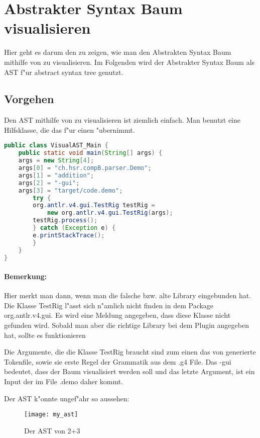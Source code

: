 
\section{Abstrakter Syntax Baum visualisieren}
\label{sec:visualizeAST}
Hier geht es darum den zu zeigen, wie man den Abstrakten Syntax Baum mithilfe von \antlr zu visualisieren. Im Folgenden wird der Abstrakter Syntax Baum als AST f"ur abstract syntax tree genutzt. 

\subsection{Vorgehen}
Den AST mithilfe von \antlr zu visualisieren ist ziemlich einfach. Man benutzt eine Hilfsklasse, die das f"ur einen "ubernimmt. 

\begin{lstlisting}[language=Java]
public class VisualAST_Main {
    public static void main(String[] args) {
	args = new String[4];
	args[0] = "ch.hsr.compB.parser.Demo";
	args[1] = "addition";
	args[2] = "-gui";
	args[3] = "target/code.demo";
	    try {
		org.antlr.v4.gui.TestRig testRig = 
		    new org.antlr.v4.gui.TestRig(args); 
		testRig.process();
	    } catch (Exception e) {
		e.printStackTrace();
	    }
    }
}
\end{lstlisting}

\paragraph{Bemerkung:}
Hier merkt man dann, wenn man die falsche bzw. alte \antlr Library eingebunden hat. Die Klasse TestRig l"asst sich n"amlich nicht finden in dem Package org.antlr.v4.gui. Es wird eine Meldung angegeben, dass diese Klasse nicht gefunden wird. Sobald man aber die richtige Library bei dem Plugin angegeben hat, sollte es funktionieren

Die Argumente, die die Klasse TestRig braucht sind zum einen das von \antlr generierte Tokenfile, sowie sie erste Regel der Grammatik aus dem .g4 File. Das -gui bedeutet, dass der Baum visualisiert werden soll und das letzte Argument, ist ein Input der im File .demo daher kommt.

Der AST k"onnte ungef"ahr so aussehen:

\begin{figure}[H]
	\centering
	\texttt{[image: my\_ast]}
	\caption{Der AST von 2+3}
\end{figure}

